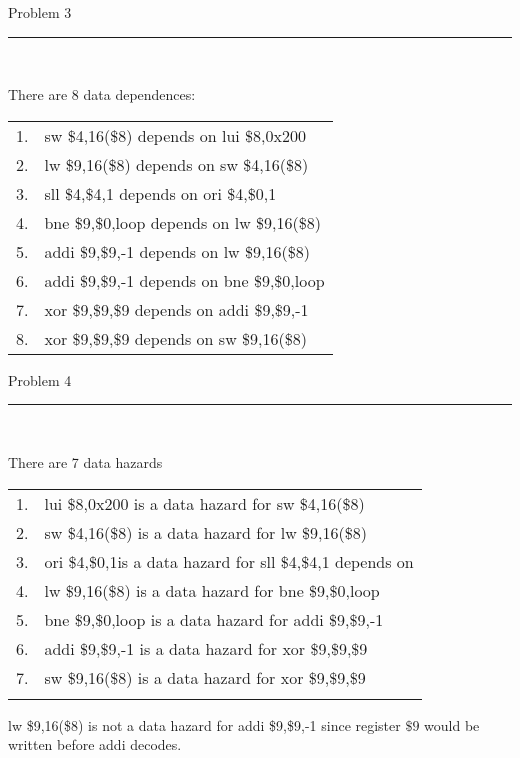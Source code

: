 \documentclass[11pt,reqno]{article}
\begin{document}
\begin{flushleft} 
Problem 3 \\
\rule{500pt}{1pt}\\
\end{flushleft} 

\noindent There are 8 data dependences:

\begin{tabular}{c l}
1.& sw \$4,16(\$8) depends on lui \$8,0x200 \\
2.& lw \$9,16(\$8) depends on sw \$4,16(\$8) \\
3.& sll \$4,\$4,1 depends on ori \$4,\$0,1 \\
4.& bne \$9,\$0,loop depends on lw \$9,16(\$8) \\
5.& addi \$9,\$9,-1 depends on lw \$9,16(\$8) \\
6.& addi \$9,\$9,-1 depends on bne \$9,\$0,loop \\
7.& xor \$9,\$9,\$9 depends on addi \$9,\$9,-1 \\
8.& xor \$9,\$9,\$9 depends on sw \$9,16(\$8) \\
\end{tabular}

\begin{flushleft} 
Problem 4 \\
\rule{500pt}{1pt}\\
\end{flushleft} 

\noindent There are 7 data hazards

\begin{tabular}{c l}
1.&  lui \$8,0x200 is a data hazard for sw \$4,16(\$8)\\
2.& sw \$4,16(\$8) is a data hazard for lw \$9,16(\$8)\\
3.& ori \$4,\$0,1is a data hazard for sll \$4,\$4,1 depends on \\
4.& lw \$9,16(\$8) is a data hazard for bne \$9,\$0,loop \\
5.& bne \$9,\$0,loop is a data hazard for addi \$9,\$9,-1 \\
6.& addi \$9,\$9,-1 is a data hazard for xor \$9,\$9,\$9 \\
7.& sw \$9,16(\$8) is a data hazard for xor \$9,\$9,\$9 \\\\
\end{tabular}

lw \$9,16(\$8) is not a data hazard for addi \$9,\$9,-1 since register $\$9$ would be written before addi decodes.
\end{document}
